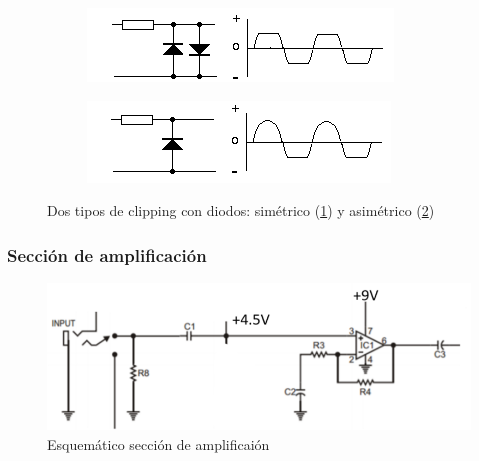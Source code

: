 \documentclass[../../main.tex]{subfiles}
\begin{document}
\begin{figure}[H]		%
	\centering
	\begin{subfigure}[b]{0.45\textwidth}
		\centering
		\includegraphics[scale=.8]{imagenes/diode_clipping_symmetrical.png}
		\caption{}
		\label{fig:ej5_diode_clipping_sym}
	\end{subfigure}
	\begin{subfigure}[b]{0.45\textwidth}
		\centering
		\includegraphics[scale=.8]{imagenes/diode_clipping_asymmetrical.png}
		\caption{ }
		\label{fig:ej5_diode_clipping_asym}
	\end{subfigure}
	\caption{Dos tipos de clipping con diodos: sim\'etrico (\ref{fig:ej5_diode_clipping_sym}) y asim\'etrico (\ref{fig:ej5_diode_clipping_asym})}
	\label{fig:ej5_diode_clipping}
\end{figure}


\subsubsection{Secci\'on de amplificaci\'on}

\begin{figure}[H]	%
	\centering
	\includegraphics[scale=1]{imagenes/esquematico_amplificacion.png}
	\caption{Esquem\'atico secci\'on de amplificai\'on}
	\label{fig:ej5_esquematico_amplificacion}
\end{figure}
\end{document}
